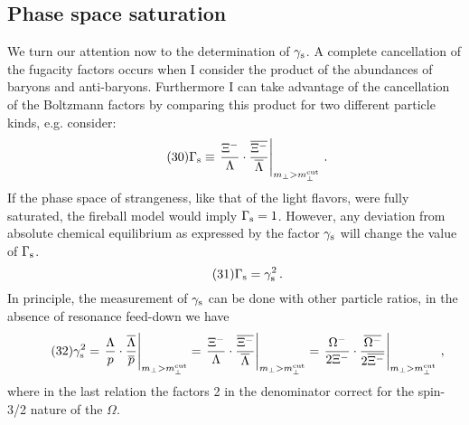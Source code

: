 \begin{mdframed}[linecolor=gray,roundcorner=12pt,backgroundcolor=Dandelion!15,linewidth=1pt,leftmargin=0cm,rightmargin=0cm,topline=true,bottomline=true,skipabove=12pt]
\subsection*{Phase space saturation} 
We turn our attention now to the determination of $\gamma_{\rm s}$. A
complete cancellation of the fugacity factors occurs when I consider the
product of the abundances of baryons and anti-baryons. Furthermore I can
take advantage of the cancellation of the Boltzmann factors by comparing
this product for two different particle kinds, e.g. consider:
\begin{equation}
\tag{30} \Gamma_{\rm s} \equiv \left. {\Xi^-\over\Lambda}
 \cdot {\overline{\Xi^-}\over \overline{\Lambda} 
 }\right\vert_{m_\bot>m_\bot^{\rm cut}} \, .
\end{equation} 
If the phase space of strangeness, like that of the light flavors, were
fully saturated, the fireball model would imply $\Gamma_{\rm s}=1$.
However, any deviation from absolute chemical equilibrium as expressed by
the factor $\gamma_{\rm s}$ will change the value of $\Gamma_{\rm s}$. 
\begin{equation}
\tag{31} \Gamma_{\rm s}=\gamma_{\rm s}^2\, .
\end{equation}
In principle, the measurement of $\gamma_{\rm s}$ can be done with other
particle ratios, in the absence of resonance feed-down we have
\begin{equation}
 \tag{32} \gamma_{\rm s}^2 = \left. 
 {\Lambda\over p} \cdot {\overline{\Lambda}\over \overline p} 
   \right\vert_{m_\bot>m_\bot^{\rm cut}}
   = \left. 
 {\Xi^-\over\Lambda} \cdot {\overline{\Xi^-} \over
\overline{\Lambda}}
   \right\vert_{m_\perp>m_\perp^{\rm cut}} 
   = \left. 
 {\Omega^-\over 2\Xi^-} \cdot {\overline{\Omega^-} \over 
      2\overline{\Xi^-}}
   \right\vert_{m_\perp>m_\perp^{\rm cut}} \, ,
\end{equation}
where in the last relation the factors 2 in the denominator correct 
for the spin-3/2 nature of the $\Omega$.
 

\end{mdframed}
